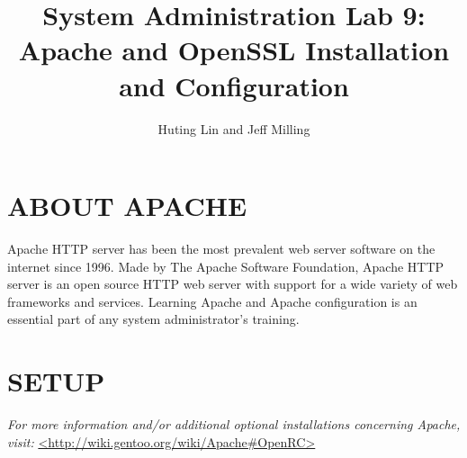 \documentclass[11pt]{article}
\title{System Administration Lab 9: Apache and OpenSSL Installation and Configuration\vspace{-2ex}}
\author{Huting Lin and Jeff Milling}
\date{}
\begin{document}
\maketitle

\section*{ABOUT APACHE}

Apache HTTP server has been the most prevalent web server software on the internet since 1996. Made by The Apache Software Foundation, Apache HTTP server is an open source HTTP web server with support for a wide variety of web frameworks and services. Learning Apache and Apache configuration is an essential part of any system administrator's training.

\section*{SETUP}

\textit{For more information and/or additional optional installations concerning Apache, visit:} \url{<http://wiki.gentoo.org/wiki/Apache#OpenRC>} 
\end{document}
